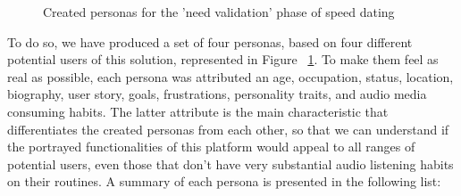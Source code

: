 \begin{figure}[htbp]
	\centering
	 \qquad
		 \qquad
	\caption{Created personas for the 'need validation' phase of speed dating}
	\label{fig:personas}
\end{figure}


To do so, we have produced a set of four personas, based on four different potential users of this solution, represented in Figure ~\ref{fig:personas}. To make them feel as real as possible, each persona was attributed an age, occupation, status, location, biography, user story, goals, frustrations, personality traits, and audio media consuming habits. The latter attribute is the main characteristic that differentiates the created personas from each other, so that we can understand if the portrayed functionalities of this platform would appeal to all ranges of potential users, even those that don't have very substantial audio listening habits on their routines. A summary of each persona is presented in the following list:


